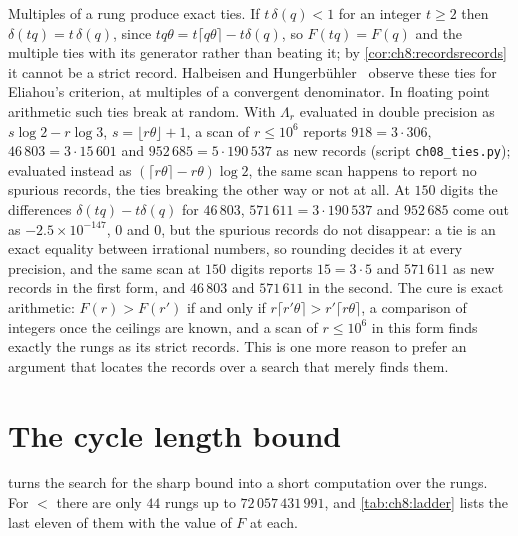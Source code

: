 \begin{remark}\label{rem:ch8:ties}
Multiples of a rung produce exact ties. If $t\,\delta(q)<1$ for an integer $t\geq2$ then
$\delta(tq)=t\,\delta(q)$, since $tq\theta=t\lceil q\theta\rceil-t\delta(q)$,
so $F(tq)=F(q)$ and the multiple ties with its generator rather than beating
it; by \cref{cor:ch8:recordsrecords} it cannot be a strict record.
Halbeisen and Hungerb\"uhler~\cite[\S4.4]{halbeisen1997} observe these ties for Eliahou's criterion, at multiples of a convergent denominator. In floating
point arithmetic such ties break at random. With $\Lambda_r$ evaluated in
double precision as $s\log2-r\log3$, $s=\lfloor r\theta\rfloor+1$, a scan of
$r\leq10^6$ reports $918=3\cdot306$, $46\,803=3\cdot15\,601$ and
$952\,685=5\cdot190\,537$ as new records (script \texttt{ch08\_ties.py});
evaluated instead as $(\lceil r\theta\rceil-r\theta)\log2$, the same scan
happens to report no spurious records, the ties breaking the other way or not
at all.
At $150$ digits the differences $\delta(tq)-t\delta(q)$ for $46\,803$, $571\,611=3\cdot190\,537$ and $952\,685$ come out as $-2.5\times10^{-147}$, $0$ and $0$, but the spurious records do not disappear: a tie is an exact equality between irrational numbers, so rounding decides it at every precision, and the same scan at $150$ digits reports $15=3\cdot5$ and $571\,611$ as new records in the first form, and $46\,803$ and $571\,611$ in the second.
The cure is exact arithmetic: $F(r)>F(r')$ if and only if $r\lceil r'\theta\rceil>r'\lceil r\theta\rceil$, a comparison of integers once the ceilings are known, and a scan of $r\leq10^6$ in this form finds exactly the rungs as its strict records.
This is one more reason to prefer an argument that locates the records over
a search that merely finds them.
\end{remark}

\section{The cycle length bound}\label{sec:ch8:bound}

 turns the search for the sharp bound into a short
computation over the rungs. For $\lt$ there are only $44$ rungs up to
$72\,057\,431\,991$, and \cref{tab:ch8:ladder} lists the last eleven of them
with the value of $F$ at each.

